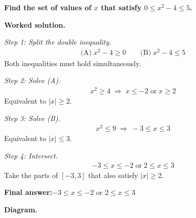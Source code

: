 \documentclass[11pt]{article}
\newcommand{\question}[1]{\par\medskip\noindent\textbf{#1}\par}
\begin{document}
\question{Find the set of values of \( x \) that satisfy \( 0 \leq x^2 - 4 \leq 5 \).}

\textbf{Worked solution.}

\textit{Step 1: Split the double inequality.}
\[\begin{gathered}
\text{(A)}\; x^2 - 4 \geq 0 \qquad \text{(B)}\; x^2 - 4 \leq 5
\end{gathered}\]
Both inequalities must hold simultaneously.

\textit{Step 2: Solve (A).}
\[\begin{gathered}
x^2 \geq 4 \;\Longrightarrow\; x \leq -2 \;\text{or}\; x \geq 2
\end{gathered}\]
Equivalent to \( |x| \geq 2 \).

\textit{Step 3: Solve (B).}
\[\begin{gathered}
x^2 \leq 9 \;\Longrightarrow\; -3 \leq x \leq 3
\end{gathered}\]
Equivalent to \( |x| \leq 3 \).

\textit{Step 4: Intersect.}
\[\begin{gathered}
-3 \leq x \leq -2 \;\text{or}\; 2 \leq x \leq 3
\end{gathered}\]
Take the parts of \( [-3, 3] \) that also satisfy \( |x| \geq 2 \).

\begin{answerbox}
\textbf{Final answer:}\quad \(\displaystyle -3 \leq x \leq -2\) or \(\displaystyle 2 \leq x \leq 3\)
\end{answerbox}
\textbf{Diagram.}
\end{document}
